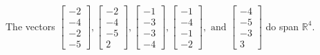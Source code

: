 \begin{exercise}
\begin{exerciseStatement}
  \end{exerciseStatement}
  \begin{exerciseAnswer}
   The vectors \(\left[\begin{array}{r}
-2 \\
-4 \\
-2 \\
-5
\end{array}\right] , \left[\begin{array}{r}
-2 \\
-4 \\
-5 \\
2
\end{array}\right] , \left[\begin{array}{r}
-1 \\
-3 \\
-3 \\
-4
\end{array}\right] , \left[\begin{array}{r}
-1 \\
-4 \\
-1 \\
-2
\end{array}\right] , \text{ and } \left[\begin{array}{r}
-4 \\
-5 \\
-3 \\
3
\end{array}\right]\) 
  	 do  
	span \(\mathbb{R}^4\).
  


  \end{exerciseAnswer}
\end{exercise}